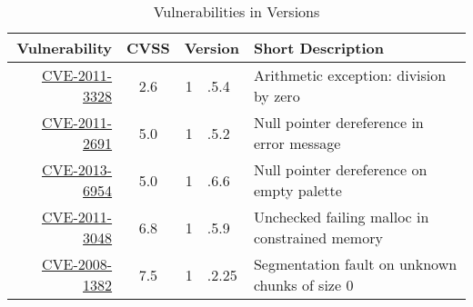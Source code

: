 \begin{table}[H]
\centering
\begin{tabular}{|r|c|r@{}l|l|}
\hline
Vulnerability & CVSS  & \multicolumn{2}{c|}{Version} & Short Description \\ \hline \hline 
\href{https://cve.mitre.org/cgi-bin/cvename.cgi?name=CVE-2011-3328}{CVE-2011-3328} & 2.6   & 1&.5.4 	& Arithmetic exception: division by zero   \\ \hline  %
\href{https://cve.mitre.org/cgi-bin/cvename.cgi?name=CVE-2011-2691}{CVE-2011-2691} & 5.0   & 1&.5.2	& Null pointer dereference in error message \\ \hline %
\href{https://cve.mitre.org/cgi-bin/cvename.cgi?name=CVE-2013-6954}{CVE-2013-6954} & 5.0   & 1&.6.6  & Null pointer dereference on empty palette \\ \hline %
\href{https://cve.mitre.org/cgi-bin/cvename.cgi?name=CVE-2011-3048}{CVE-2011-3048} & 6.8   & 1&.5.9  & Unchecked failing malloc in constrained memory \\ \hline %
\href{https://cve.mitre.org/cgi-bin/cvename.cgi?name=CVE-2008-1382}{CVE-2008-1382} & 7.5   & 1&.2.25 & Segmentation fault on unknown chunks of size 0\\ \hline %
\end{tabular}
\caption{Vulnerabilities in \libpng Versions}
\label{tbl:png:vulns}
\end{table}

